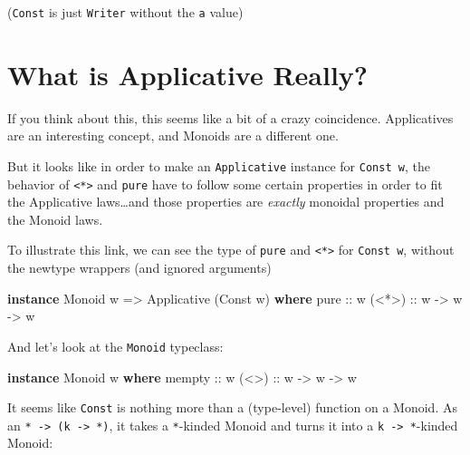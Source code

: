 \documentclass[]{article}
\newenvironment{Shaded}{}{}
\newcommand{\DataTypeTok}[1]{\textcolor[rgb]{0.56,0.13,0.00}{#1}}
\newcommand{\KeywordTok}[1]{\textcolor[rgb]{0.00,0.44,0.13}{\textbf{#1}}}
\newcommand{\NormalTok}[1]{#1}
\newcommand{\OtherTok}[1]{\textcolor[rgb]{0.00,0.44,0.13}{#1}}
\begin{document}
(\texttt{Const} is just \texttt{Writer} without the \texttt{a} value)

\hypertarget{what-is-applicative-really}{%
\section{What is Applicative Really?}\label{what-is-applicative-really}}

If you think about this, this seems like a bit of a crazy coincidence.
Applicatives are an interesting concept, and Monoids are a different one.

But it looks like in order to make an \texttt{Applicative} instance for
\texttt{Const\ w}, the behavior of \texttt{\textless{}*\textgreater{}} and
\texttt{pure} have to follow some certain properties in order to fit the
Applicative laws\ldots{}and those properties are \emph{exactly} monoidal
properties and the Monoid laws.

To illustrate this link, we can see the type of \texttt{pure} and
\texttt{\textless{}*\textgreater{}} for \texttt{Const\ w}, without the newtype
wrappers (and ignored arguments)

\begin{Shaded}
\begin{Highlighting}[]
\KeywordTok{instance} \DataTypeTok{Monoid}\NormalTok{ w }\OtherTok{=>} \DataTypeTok{Applicative}\NormalTok{ (}\DataTypeTok{Const}\NormalTok{ w) }\KeywordTok{where}
\OtherTok{    pure  ::}\NormalTok{ w}
\OtherTok{    (<*>) ::}\NormalTok{ w }\OtherTok{->}\NormalTok{ w }\OtherTok{->}\NormalTok{ w}
\end{Highlighting}
\end{Shaded}

And let's look at the \texttt{Monoid} typeclass:

\begin{Shaded}
\begin{Highlighting}[]
\KeywordTok{instance} \DataTypeTok{Monoid}\NormalTok{ w }\KeywordTok{where}
\OtherTok{    mempty ::}\NormalTok{ w}
\OtherTok{    (<>)   ::}\NormalTok{ w }\OtherTok{->}\NormalTok{ w }\OtherTok{->}\NormalTok{ w}
\end{Highlighting}
\end{Shaded}

It seems like \texttt{Const} is nothing more than a (type-level) function on a
Monoid. As an \texttt{*\ -\textgreater{}\ (k\ -\textgreater{}\ *)}, it takes a
\texttt{*}-kinded Monoid and turns it into a
\texttt{k\ -\textgreater{}\ *}-kinded Monoid:
\end{document}
